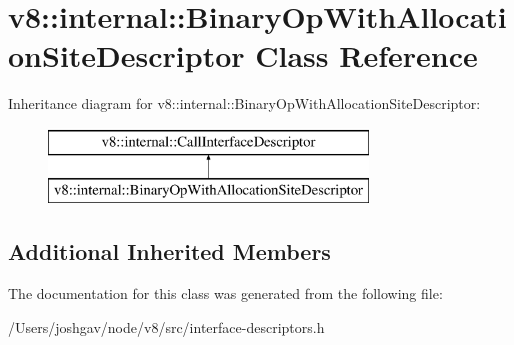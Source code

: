 \hypertarget{classv8_1_1internal_1_1_binary_op_with_allocation_site_descriptor}{}\section{v8\+:\+:internal\+:\+:Binary\+Op\+With\+Allocation\+Site\+Descriptor Class Reference}
\label{classv8_1_1internal_1_1_binary_op_with_allocation_site_descriptor}
Inheritance diagram for v8\+:\+:internal\+:\+:Binary\+Op\+With\+Allocation\+Site\+Descriptor\+:\begin{figure}[H]
\begin{center}
\leavevmode
\includegraphics[height=2.000000cm]{classv8_1_1internal_1_1_binary_op_with_allocation_site_descriptor}
\end{center}
\end{figure}
\subsection*{Additional Inherited Members}


The documentation for this class was generated from the following file\+:\begin{DoxyCompactItemize}
\item 
/\+Users/joshgav/node/v8/src/interface-\/descriptors.\+h\end{DoxyCompactItemize}
